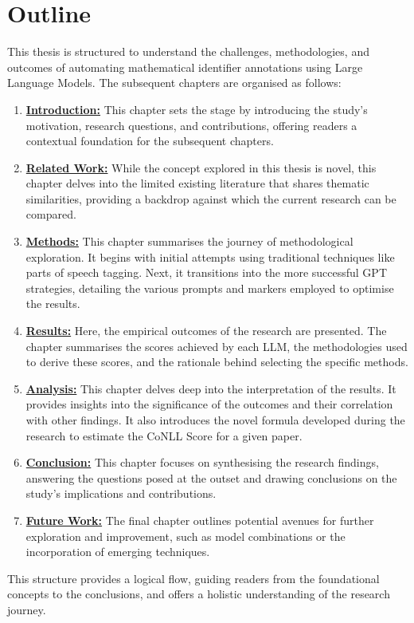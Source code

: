 \section{Outline}

This thesis is structured to understand the challenges, methodologies, and outcomes of automating mathematical identifier annotations using Large Language Models. The subsequent chapters are organised as follows:

\begin{enumerate}
    \item \textbf{\hyperref[chapter:introduction]{Introduction:}}  This chapter sets the stage by introducing the study's motivation, research questions, and contributions, offering readers a contextual foundation for the subsequent chapters.
    
    \item \textbf{\hyperref[chapter:related_work]{Related Work:}} While the concept explored in this thesis is novel, this chapter delves into the limited existing literature that shares thematic similarities, providing a backdrop against which the current research can be compared.
    
    \item \textbf{\hyperref[chapter:methods]{Methods:}} This chapter summarises the journey of methodological exploration. It begins with initial attempts using traditional techniques like parts of speech tagging. Next, it transitions into the more successful GPT strategies, detailing the various prompts and markers employed to optimise the results.
    
    \item \textbf{\hyperref[chapter:results]{Results:}} Here, the empirical outcomes of the research are presented. The chapter summarises the scores achieved by each LLM, the methodologies used to derive these scores, and the rationale behind selecting the specific methods.
    
    \item \textbf{\hyperref[chapter:analysis]{Analysis:}} This chapter delves deep into the interpretation of the results. It provides insights into the significance of the outcomes and their correlation with other findings. It also introduces the novel formula developed during the research to estimate the CoNLL Score for a given paper. %
    
    \item \textbf{\hyperref[chapter:conclusion]{Conclusion:}} This chapter focuses on synthesising the research findings, answering the questions posed at the outset and drawing conclusions on the study's implications and contributions.
    
    \item \textbf{\hyperref[chapter:future_works]{Future Work:}} The final chapter outlines potential avenues for further exploration and improvement, such as model combinations or the incorporation of emerging techniques.
    
    
\end{enumerate}

This structure provides a logical flow, guiding readers from the foundational concepts to the conclusions, and offers a holistic understanding of the research journey.

